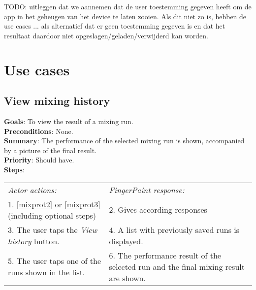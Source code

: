 \begin{appendices}

TODO: uitleggen dat we aannemen dat de user toestemming gegeven heeft om de app in het geheugen van het device te laten zooien. Als dit niet zo is, hebben de use cases ... als alternatief dat er geen toestemming gegeven is en dat het resultaat daardoor niet opgeslagen/geladen/verwijderd kan worden.

\chapter{Use cases}
\section{View mixing history}
  \label{mixhist}
  \textbf{Goals}: To view the result of a mixing run.\\
  \textbf{Preconditions}: None.\\
  \textbf{Summary}: The performance of the selected mixing run is shown, accompanied by a picture of the final result.\\
  \textbf{Priority}: Should have.\\
  \textbf{Steps}: \\
    \begin{tabular}{ p{} p{} }
  	\emph{Actor actions:} & \emph{FingerPaint response:} \\
    1. \ref{mixprot2} or \ref{mixprot3} (including optional steps) & 2. Gives according responses\\
    3. The user taps the \emph{View history} button. & 4. A list with previously saved runs is displayed. \\
    5. The user taps one of the runs shown in the list. & 6. The performance result of the selected run and the final mixing result are shown. \\
    \end{tabular}


\end{appendices}
